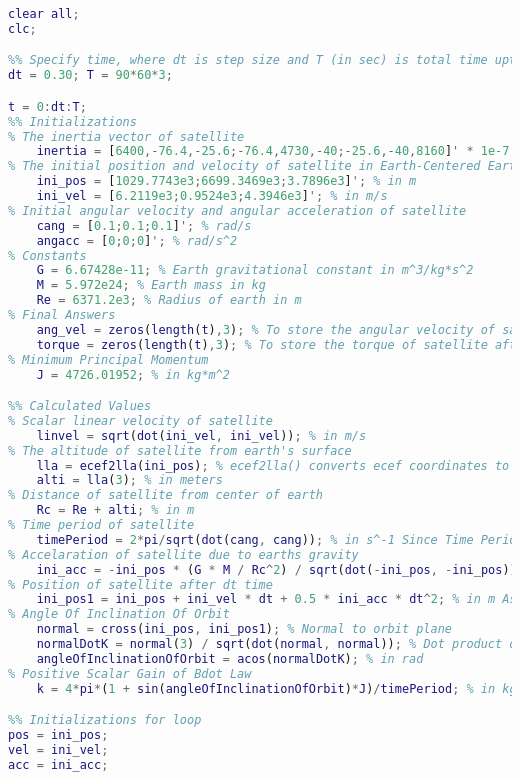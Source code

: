 \documentclass[11pt]{article}
\begin{document}
\begin{lstlisting}[language=MATLAB]
clear all;
clc;

%% Specify time, where dt is step size and T (in sec) is total time upto which the algorithm will run
dt = 0.30; T = 90*60*3;

t = 0:dt:T;
%% Initializations
% The inertia vector of satellite
    inertia = [6400,-76.4,-25.6;-76.4,4730,-40;-25.6,-40,8160]' * 1e-7; % in kg*m^2
% The initial position and velocity of satellite in Earth-Centered Earth-Fixed    
    ini_pos = [1029.7743e3;6699.3469e3;3.7896e3]'; % in m
    ini_vel = [6.2119e3;0.9524e3;4.3946e3]'; % in m/s
% Initial angular velocity and angular acceleration of satellite
    cang = [0.1;0.1;0.1]'; % rad/s
    angacc = [0;0;0]'; % rad/s^2
% Constants
    G = 6.67428e-11; % Earth gravitational constant in m^3/kg*s^2
    M = 5.972e24; % Earth mass in kg
    Re = 6371.2e3; % Radius of earth in m
% Final Answers
    ang_vel = zeros(length(t),3); % To store the angular velocity of satellite after dt time
    torque = zeros(length(t),3); % To store the torque of satellite after dt time
% Minimum Principal Momentum
    J = 4726.01952; % in kg*m^2

%% Calculated Values
% Scalar linear velocity of satellite
    linvel = sqrt(dot(ini_vel, ini_vel)); % in m/s
% The altitude of satellite from earth's surface
    lla = ecef2lla(ini_pos); % ecef2lla() converts ecef coordinates to latitude, longitude and altitude
    alti = lla(3); % in meters
% Distance of satellite from center of earth 
    Rc = Re + alti; % in m
% Time period of satellite
    timePeriod = 2*pi/sqrt(dot(cang, cang)); % in s^-1 Since Time Period = 2pi/(Angular Velocity)
% Accelaration of satellite due to earths gravity
    ini_acc = -ini_pos * (G * M / Rc^2) / sqrt(dot(-ini_pos, -ini_pos)); % in m/s^2 Since acceleration has value of GM/R^2 and in direction opposite to position vector
% Position of satellite after dt time
    ini_pos1 = ini_pos + ini_vel * dt + 0.5 * ini_acc * dt^2; % in m Assuming constant accelaration for dt time Since d = u*t + 0.5*a*t^2
% Angle Of Inclination Of Orbit
    normal = cross(ini_pos, ini_pos1); % Normal to orbit plane
    normalDotK = normal(3) / sqrt(dot(normal, normal)); % Dot product of unit normal vector with k^
    angleOfInclinationOfOrbit = acos(normalDotK); % in rad
% Positive Scalar Gain of Bdot Law
    k = 4*pi*(1 + sin(angleOfInclinationOfOrbit)*J)/timePeriod; % in kg*m^2*s Since k = 4*pi*(1+sin(angle of inclination))*Jmin/Torb

%% Initializations for loop
pos = ini_pos;
vel = ini_vel;
acc = ini_acc;


\end{lstlisting}
\end{document}
